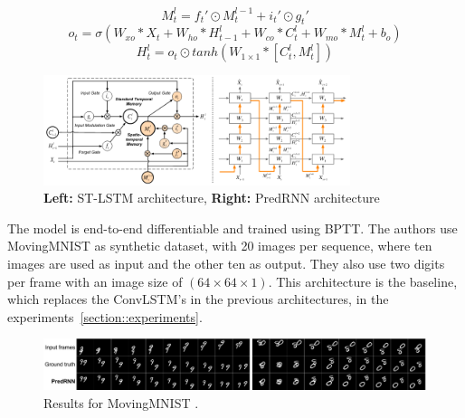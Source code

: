   \begin{equation}
   M_t^l = f_t\prime \odot M_t^{l-1} + i_t\prime \odot g_t\prime
  \end{equation}
  \begin{equation}
   o_t = \sigma(W_{xo} \ast X_t + W_{ho} \ast H_{t-1}^l + W_{co} \ast C_t^l + W_{mo} \ast M_t^l + b_o)
  \end{equation}
  \begin{equation}
   H_t^l = o_t \odot tanh(W_{1 \times 1} \ast [C_t^l, M_t^l])
  \end{equation}
  \begin{figure}[H]
   \includegraphics[width=0.8\textwidth]{../Images/wang.png}
   \centering
   \caption{\textbf{Left:} ST-LSTM architecture, \textbf{Right:} PredRNN architecture \cite{Wang2017}}
   \label{fig:wang_architecture}
  \end{figure}\noindent
  The model is end-to-end differentiable and trained using BPTT. The authors use MovingMNIST as synthetic dataset, with 20 images per sequence, where ten images
  are used as input and the other ten as output. They also use two digits per frame with an image size of $(64 \times 64 \times 1)$.
  This architecture is the baseline, which replaces the ConvLSTM's in the previous architectures, in the experiments~\ref{section::experiments}.
  \begin{figure}[H]
   \includegraphics[width=1.0\textwidth]{../Images/predrnn_mnist.png}
   \centering
   \caption{Results for MovingMNIST \cite{Wang2017}.}
   \label{fig:predrnn_mnist}
  \end{figure}\noindent